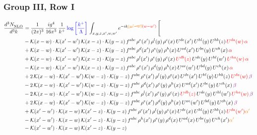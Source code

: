 \documentclass[9pt]{article}
\numberwithin{equation}{section}
\begin{document}
\subsubsection{Group III, Row I}
\begin{align}
     \frac{d^{3}N_{\rm NLO}^{\rm}}{d^{3}k}  & = \frac{1}{(2\pi)^{3}}\, \frac{ig^{4}}{16\pi^{5}}\, \frac{1}{k^{+}}\, {\color{blue}\log{\left[\frac{k^{+}}{\Lambda}\right]}}\, \int_{x,y,z,x^{\prime},w,w^{\prime}}e^{-ik{\color{orange}\cancel{(w^{\prime}-w)}}{\color{red}(w-w^{\prime})}}\, \Bigg[\notag \\ & -\mathcal{K}(x-w)\cdot \mathcal{K}(x'-w')\, \mathcal{K}(x-z)\cdot \mathcal{K}(y-z)\, f^{abc}\, \rho^{e}(x')\,\rho^{l}(y)\,\rho^{c}(x)\,U^{de}(x')\,U^{hl}(y)\,U^{hb}(z)\,{\color{red}U^{da}(w)}\, {\color{red}\alpha} \notag \\ & +\mathcal{K}(x-w)\cdot \mathcal{K}(x'-w')\, \mathcal{K}(x-z)\cdot \mathcal{K}(y-z)\, f^{abc}\, \rho^{d}(x')\,\rho^{e}(y)\,\rho^{h}(x)\,U^{ad}(x')\,U^{be}(y)\,U^{ch}(x)\, {\color{red}\alpha} \notag \\ & + \mathcal{K}(x-w)\cdot \mathcal{K}(x'-w')\, \mathcal{K}(x-z)\cdot \mathcal{K}(y-z)\, f^{abc}\, \rho^{l}(x')\,\rho^{e}(y)\,\rho^{c}(x)\,{\color{red}U^{db}(z)}\,U^{de}(y)\,U^{hl}(w')\,{\color{red}U^{ha}(w)}\, {\color{red}\alpha} \notag \\ & -\mathcal{K}(x-w)\cdot \mathcal{K}(x'-w')\, \mathcal{K}(x-z)\cdot \mathcal{K}(y-z)\, f^{abc}\, \rho^{e}(x')\,\rho^{d}(y)\,\rho^{h}(x)\,U^{ae}(w')\,U^{bd}(y)\,U^{ch}(x)\, {\color{red}\alpha} \notag \\ & +2\, \mathcal{K}(x-w)\cdot \mathcal{K}(x'-w')\, \mathcal{K}(w-z) \cdot \mathcal{K}(y-z)\, f^{abc}\, \rho^{e}(x')\,\rho^{l}(y)\, \rho^{c}(x)\, U^{de}(x')\,U^{hl}(y)\,U^{hb}(z)\,{\color{red}U^{da}(w)}\, {\color{violet} \beta} \notag \\ & -2\, \mathcal{K}(x-w)\cdot \mathcal{K}(x'-w')\, \mathcal{K}(w-z) \cdot \mathcal{K}(y-z)\, f^{abc}\, \rho^{d}(x')\,\rho^{e}(y)\, \rho^{h}(x)\, U^{ad}(x')\,U^{be}(y)\,U^{ch}(x)\, {\color{violet} \beta}\notag \\ & -2\, \mathcal{K}(x-w)\cdot \mathcal{K}(x'-w')\, \mathcal{K}(w-z) \cdot \mathcal{K}(y-z)\, f^{abc}\, \rho^{l}(x')\,\rho^{e}(y)\, \rho^{c}(x)\, {\color{red}U^{db}(z)}\,U^{de}(y)\,U^{hl}(w')\,{\color{red}U^{ha}(w)}\, {\color{violet} \beta}\notag \\ & + 2\, \mathcal{K}(x-w)\cdot \mathcal{K}(x'-w')\, \mathcal{K}(w-z) \cdot \mathcal{K}(y-z)\, f^{abc}\, \rho^{e}(x')\,\rho^{d}(y)\, \rho^{h}(x)\, U^{ae}(w')\,U^{bd}(y)\,U^{ch}(x)\, {\color{violet} \beta}\notag \\ & +\mathcal{K}(x'-w')\cdot\mathcal{K}(x-w)\,\mathcal{K}(x'-z)\cdot\mathcal{K}(y-z)\, f^{abc}\,\rho^{c}(x')\,\rho^{l}(y)\,\rho^{e}(x)\,U^{de}(x)\,U^{hl}(y)\,U^{hb}(z)\,{\color{red}U^{da}(w')}{\color{orange} \alpha'}\notag\\ &-\mathcal{K}(x'-w')\cdot\mathcal{K}(x-w)\,\mathcal{K}(x'-z)\cdot\mathcal{K}(y-z)\, f^{abc}\,\rho^{h}(x')\,\rho^{e}(y)\,\rho^{d}(x)\,U^{ad}(x)\,U^{be}(y)\,U^{ch}(x'){\color{orange} \alpha'}\notag\\ &-\mathcal{K}(x'-w')\cdot\mathcal{K}(x-w)\,\mathcal{K}(x'-z)\cdot\mathcal{K}(y-z)\, 
\end{align}
\end{document}
